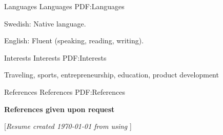 \documentclass[letterpaper,MMMyyyy,nonstopmode]{resume}
\newcommand{\gitrevision}{%
  \StrLeft{\HEAD}{7}%
}
\newcommand{\CVNote}{Resume created {\today} from {\gitrevision} using {\XeLaTeX}}
\begin{document}
\begin{Body}
\Section
{Languages}
{Languages}
{PDF:Languages}

\BulletItem
Swedish: Native language.

\Gap
\BulletItem
English: Fluent (speaking, reading, writing).


\Section
{Interests}
{Interests}
{PDF:Interests}

\Entry
Traveling, sports, entrepreneurship, education, product development


\Section
{References}
{References}
{PDF:References}

\BulletItem
\textbf{References given upon request}

\end{Body}


\BigGap
\UseNoteFont%
\null\hfill%
[\textit{\CVNote}]
\end{document}
